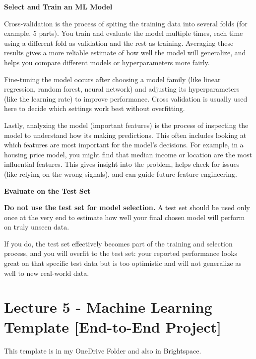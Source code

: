 {\vspace{11pt}
\textbf{Select and Train an ML Model}
\vspace{11pt}

Cross-validation is the process of spiting the training data into several folds (for example, 5 parts). You train and evaluate the model multiple times, each time using a different fold as validation and the rest as training. Averaging these results gives a more reliable estimate of how well the model will generalize, and helps you compare different models or hyperparameters more fairly.

Fine-tuning the model occurs after choosing a model family (like linear regression, random forest, neural network) and adjusting its hyperparameters (like the learning rate) to improve performance. Cross validation is usually used here to decide which settings work best without overfitting.

Lastly, analyzing the model (important features) is the process of inspecting the model to understand how its making predictions. This often includes looking at which features are most important for the model's decisions. For example, in a housing price model, you might find that median income or location are the most influential features. This gives insight into the problem, helps check for issues (like relying on the wrong signals), and can guide future feature engineering.

\vspace{11pt}
\textbf{Evaluate on the Test Set}
\vspace{11pt}

\textbf{Do not use the test set for model selection.} A test set should be used only once at the very end to estimate how well your final chosen model will perform on truly unseen data.

If you do, the test set effectively becomes part of the training and selection process, and you will overfit to the test set: your reported performance looks great on that specific test data but is too optimistic and will not generalize as well to new real-world data.

\vspace{11pt}
\section{Lecture 5 - Machine Learning Template [End-to-End Project]}
\vspace{11pt}

This template is in my OneDrive Folder and also in Brightspace.

}
